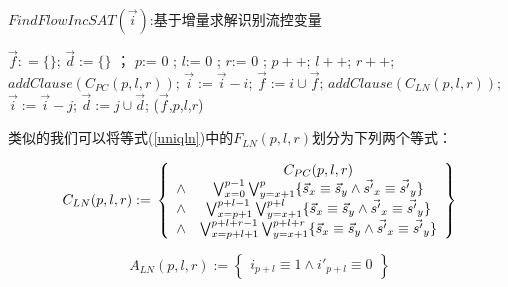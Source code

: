 \begin{algorithm}[b]
\caption{$FindFlowIncSAT(\vec{i})$:基于增量求解识别流控变量}
\label{alg_fofc_inc}
\begin{algorithmic}[1]
\STATE $\vec{f}: = \{\}$;
\STATE $\vec{d}:= \{\}$ \label{initfd2}；
\STATE $p$:= 0 ;
\STATE $l$:= 0 ;
\STATE $r$:= 0 \label{initplr2};
\STATE {}\label{while2}
\STATE  $p++$;
\STATE $l++$;
\STATE $r++$;
\STATE  $addClause(C_{PC}(p,l,r))$\label{addcls21};
  \label{solve21}
      \label{adduniq2}
      \STATE $\vec{i}:= \vec{i}-i$;
      \STATE $\vec{f}:= i\cup\vec{f}$;
    \ENDIF
  \ENDFOR
  \STATE $addClause(C_{LN}(p,l,r))$\label{addcls22};
     \label{solve22}
      \label{adduniq3}
       \label{ruleout2}
	  \STATE $\vec{i}:=\vec{i}-j$;
	  \STATE $\vec{d}:=j\cup\vec{d}$;
	   \ENDIF
      \ENDFOR
    \ENDIF
  \ENDFOR
\ENDWHILE
\RETURN ($\vec{f}$,$p$,$l$,$r$)
\end{algorithmic}
\end{algorithm}

类似的我们可以将等式(\ref{uniqln})中的$F_{LN}(p,l,r)$划分为下列两个等式：

\begin{equation}\label{uniqln_f}
C_{LN}(p,l,r):=\\
\left\{
\begin{array}{cc}
&C_{PC}(p,l,r)\\
\wedge&\bigvee_{x=0}^{p-1}\bigvee_{y=x+1}^{p} \{\vec{s}_x\equiv \vec{s}_y\wedge \vec{s'}_x\equiv \vec{s'}_y\} \\
\wedge&\bigvee_{x=p+1}^{p+l-1}\bigvee_{y=x+1}^{p+l} \{\vec{s}_x\equiv \vec{s}_y\wedge \vec{s'}_x\equiv \vec{s'}_y\} \\
\wedge&\bigvee_{x=p+l+1}^{p+l+r-1}\bigvee_{y=x+1}^{p+l+r} \{\vec{s}_x\equiv \vec{s}_y\wedge \vec{s'}_x\equiv \vec{s'}_y\}
\end{array}
\right\}
\end{equation}

\begin{equation}\label{uniqln_a}
A_{LN}(p,l,r):=
\left\{
\begin{array}{c}
 i_{p+l}\equiv 1 \wedge  i'_{p+l}\equiv 0
\end{array}
\right\}
\end{equation}



